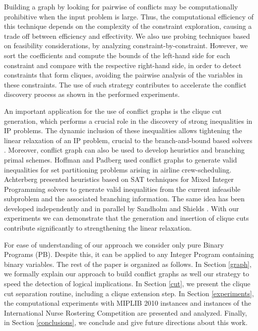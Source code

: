 \documentclass{endm}
\begin{document}
Building a graph by looking for pairwise of conflicts may be computationally prohibitive when the input problem is large. Thus, the computational efficiency of this technique depends on the complexity of the constraint exploration, causing a trade off between efficiency and effectivity. We also use probing techniques based on feasibility considerations, by analyzing constraint-by-constraint. However, we sort the coefficients and compute the bounds of the left-hand side for each constraint and compare with the respective right-hand side, in order to detect constraints that form cliques, avoiding the pairwise analysis of the variables in these constraints. The use of such strategy contributes to accelerate the conflict discovery process as shown in the performed experiments.

An important application for the use of conflict graphs is the clique cut generation, which performs a crucial role in the discovery of strong inequalities \cite{chvatal} in IP problems. The dynamic inclusion of these inequalities allows tightening the linear relaxation of an IP problem, crucial to the branch-and-bound based solvers \cite{atamturk}. Moreover, conflict graph can also be used to develop heuristics and branching primal schemes. Hoffman and Padberg \cite{hoffman} used conflict graphs to generate valid inequalities for set partitioning problems arising in airline crew-scheduling. Achterberg \cite{achterberg} presented heuristics based on SAT techniques for Mixed Integer Programming solvers to generate valid inequalities from the current infeasible subproblem and the associated branching information. The same idea has been developed independently and in parallel by Sandholm and Shields \cite{sandholm}. With our experiments we can demonstrate that the generation and insertion of clique cuts contribute significantly to strengthening the linear relaxation.

For ease of understanding of our approach we consider only pure Binary Programs (PB). Despite this, it can be applied to any Integer Program containing binary variables. The rest of the paper is organized as follows. In Section \ref{graph}, we formally explain our approach to build conflict graphs as well our strategy to speed the detection of logical implications. In Section \ref{cut}, we present the clique cut separation routine, including a clique extension step. In Section \ref{experiments}, the computational experiments with MIPLIB 2010 instances \cite{miplib} and instances of the International Nurse Rostering Competition \cite{haspeslagh} are presented and analyzed. Finally, in Section \ref{conclusions}, we conclude and give future directions about this work.
\end{document}
